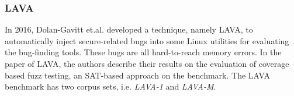 \subsubsection{LAVA}
\noindent In 2016, Dolan-Gavitt et.al. developed a technique, namely LAVA, to automatically inject secure-related bugs into some Linux utilities for evaluating the bug-finding tools. These bugs are all hard-to-reach memory errors. In the paper of LAVA, the authors describe their results on the evaluation of coverage based fuzz testing, an SAT-based approach on the benchmark. The LAVA benchmark has two corpus sets, i.e. \textit{LAVA-1} and \textit{LAVA-M}.

